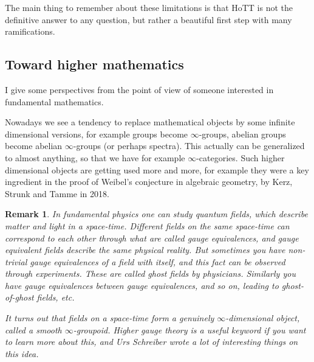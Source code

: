 \documentclass{article}
\newcommand{\sse}[1]{\medbreak \subsection{#1}}
\newtheorem{remark}{Remark}
\begin{document}
\noindent The main thing to remember about these limitations is that HoTT is not the definitive answer to any question, but rather a beautiful first step with many ramifications.


\sse{Toward higher mathematics}

I give some perspectives from the point of view of someone interested in fundamental mathematics. %




Nowadays we see a tendency to replace mathematical objects by some infinite dimensional versions, for example groups become $\infty$-groups, abelian groups become abelian $\infty$-groups (or perhaps spectra). This actually can be generalized to almost anything, so that we have for example $\infty$-categories. Such higher dimensional objects are getting used more and more, for example they were a key ingredient in the proof of Weibel's conjecture in algebraic geometry, by Kerz, Strunk and Tamme in 2018.

\begin{remark}
In fundamental physics one can study quantum fields, which describe matter and light in a space-time. Different fields on the same space-time can correspond to each other through what are called gauge equivalences, and gauge equivalent fields describe the same physical reality. But sometimes you have non-trivial gauge equivalences of a field with itself, and this fact can be observed through experiments. These are called ghost fields by physicians. Similarly you have gauge equivalences between gauge equivalences, and so on, leading to ghost-of-ghost fields, etc.

It turns out that fields on a space-time form a genuinely $\infty$-dimensional object, called a smooth $\infty$-groupoid. \emph{Higher gauge theory} is a useful keyword if you want to learn more about this, and Urs Schreiber wrote a lot of interesting things on this idea.
\end{remark}
\end{document}
